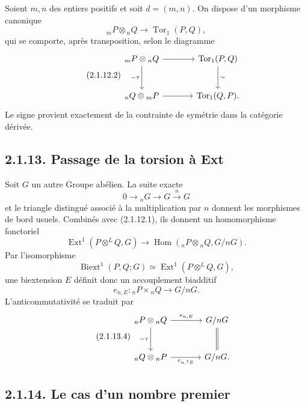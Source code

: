 \documentclass[11pt]{article}
\providecommand{\Tor}{\operatorname{Tor}}
\providecommand{\Hom}{\operatorname{Hom}}
\providecommand{\Ext}{\operatorname{Ext}}
\providecommand{\Biext}{\operatorname{Biext}}
\begin{document}
Soient \(m,n\) des entiers positifs et soit \(d=(m,n)\).  On dispose d'un morphisme canonique
\begin{equation}\tag{2.1.12.1}
        {}_mP\otimes {}_nQ\longrightarrow \Tor_1(P,Q),
\end{equation}
qui se comporte, après transposition, selon le diagramme
\begin{equation}\tag{2.1.12.2}
\begin{tikzcd}[column sep=large,row sep=large]
{}_mP\otimes {}_nQ\arrow[r]\arrow[d,"-\tau"']&\Tor_1(P,Q)\arrow[d,"\sim"]\\
{}_nQ\otimes {}_mP\arrow[r]&\Tor_1(Q,P).
\end{tikzcd}
\end{equation}
Le signe provient exactement de la contrainte de symétrie dans la catégorie dérivée.

\subsection*{2.1.13. Passage de la torsion à Ext}

Soit \(G\) un autre Groupe abélien.  La suite exacte
\begin{equation}\tag{2.1.13.1}
        0\longrightarrow {}_nG\longrightarrow G\xrightarrow{n}G
\end{equation}
et le triangle distingué associé à la multiplication par \(n\) donnent les morphismes de bord usuels.  Combinés avec (2.1.12.1), ils donnent un homomorphisme fonctoriel
\begin{equation}\tag{2.1.13.2}
        \Ext^1(P\otimes^LQ,G)\longrightarrow
        \Hom({}_nP\otimes {}_nQ,G/nG).
\end{equation}
Par l'isomorphisme
\[
        \Biext^1(P,Q;G)\simeq\Ext^1(P\otimes^LQ,G),
\]
une biextension \(E\) définit donc un accouplement biadditif
\begin{equation}\tag{2.1.13.3}
        e_{n,E}:{}_nP\times {}_nQ\longrightarrow G/nG.
\end{equation}
L'anticommutativité se traduit par
\begin{equation}\tag{2.1.13.4}
\begin{tikzcd}[column sep=large,row sep=large]
{}_nP\otimes{}_nQ\arrow[r,"e_{n,E}"]\arrow[d,"-\tau"']&G/nG\arrow[d,equal]\\
{}_nQ\otimes{}_nP\arrow[r,"e_{n,{}^{t}E}"']&G/nG .
\end{tikzcd}
\end{equation}

\subsection*{2.1.14. Le cas d'un nombre premier}
\end{document}
